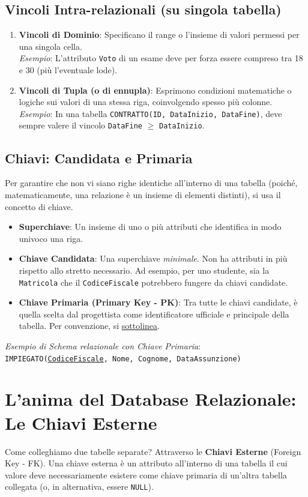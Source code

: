 \subsection{Vincoli Intra-relazionali (su singola tabella)}
\begin{enumerate}
    \item \textbf{Vincoli di Dominio}: Specificano il range o l'insieme di valori permessi per una singola cella. 
    \\[0.1cm] \textit{Esempio}: L'attributo \texttt{Voto} di un esame deve per forza essere compreso tra 18 e 30 (più l'eventuale lode).
    \item \textbf{Vincoli di Tupla (o di ennupla)}: Esprimono condizioni matematiche o logiche sui valori di una stessa riga, coinvolgendo spesso più colonne.
    \\[0.1cm] \textit{Esempio}: In una tabella \texttt{CONTRATTO(ID, DataInizio, DataFine)}, deve sempre valere il vincolo \texttt{DataFine} $\geq$ \texttt{DataInizio}.
\end{enumerate}

\subsection{Chiavi: Candidata e Primaria}
Per garantire che non vi siano righe identiche all'interno di una tabella (poiché, matematicamente, una relazione è un insieme di elementi distinti), si usa il concetto di chiave.
\begin{itemize}
    \item \textbf{Superchiave}: Un insieme di uno o più attributi che identifica in modo univoco una riga.
    \item \textbf{Chiave Candidata}: Una superchiave \textit{minimale}. Non ha attributi in più rispetto allo stretto necessario. Ad esempio, per uno studente, sia la \texttt{Matricola} che il \texttt{CodiceFiscale} potrebbero fungere da chiavi candidate.
    \item \textbf{Chiave Primaria (Primary Key - PK)}: Tra tutte le chiavi candidate, è quella scelta dal progettista come identificatore ufficiale e principale della tabella. Per convenzione, si \underline{sottolinea}.
\end{itemize}
\textit{Esempio di Schema relazionale con Chiave Primaria}: 
\\[0.1cm]
\texttt{IMPIEGATO(\underline{CodiceFiscale}, Nome, Cognome, DataAssunzione)}

\section{L'anima del Database Relazionale: Le Chiavi Esterne}
Come colleghiamo due tabelle separate? Attraverso le \textbf{Chiavi Esterne} (Foreign Key - FK). 
Una chiave esterna è un attributo all'interno di una tabella il cui valore deve necessariamente esistere come chiave primaria di un'altra tabella collegata (o, in alternativa, essere \texttt{NULL}). 

